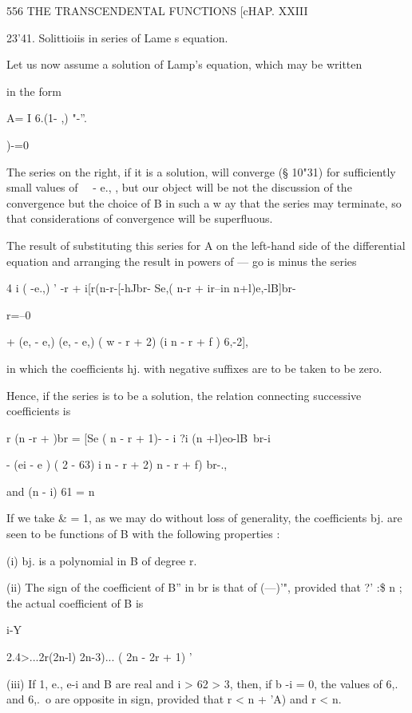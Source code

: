 {{{{556 THE TRANSCENDENTAL FUNCTIONS [cHAP. XXIII 

23'41. Solittioiis in series of Lame s equation. 

Let us now assume a solution of Lamp's equation, which may be written 

in the form 

A= I 6.(1- ,) "-''. 

)-=0 

The series on the right, if it is a solution, will converge (§ 10"31) for 
sufficiently small values of \ \   - e., , but our object will be not the discussion 
of the convergence but the choice of B in such a w ay that the series may 
terminate, so that considerations of convergence will be superfluous. 

The result of substituting this series for A on the left-hand side of the 
differential equation and arranging the result in powers of   — go is minus the 
series 

4 i ( -e.,) ' -r + i[r(n-r-[-hJbr- Se,( n-r + ir--in n+l)e,-lB]br-  

r=--0 

+ (e, - e,) (e, - e,) (  w - r + 2) (i n - r + f ) 6,-2], 

in which the coefficients hj. with negative suffixes are to be taken to be zero. 

Hence, if the series is to be a solution, the relation connecting successive 
coefficients is 

r (n -r +  )br = [Se  ( n - r + 1)- - i ?i (n +l)eo-lB\ br-i 

- (ei - e ) ( 2 - 63) i n - r + 2)   n - r + f) br-., 

and (n - i) 61 =   n%

If we take \&  = 1, as we may do without loss of generality, the coefficients 
bj. are seen to be functions of B with the following properties : 

(i) bj. is a polynomial in B of degree r. 

(ii) The sign of the coefficient of B'' in br is that of (—)'", provided that 
?' :\$ n ; the actual coefficient of B  is 

i-Y 



2.4>...2r(2n-l) 2n-3)... ( 2n - 2r + 1) ' 

(iii) If  1, e., e-i and B are real and  i > 62 >  3, then, if b -i = 0, the values 
of 6,. and 6,.\ o are opposite in sign, provided that r <    n + 'A) and r < n. 

}}}}

